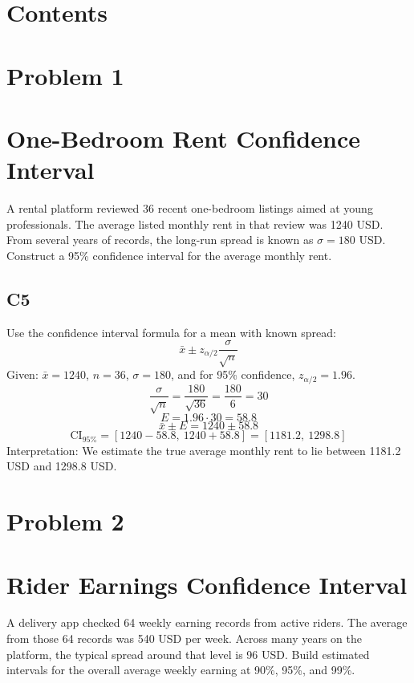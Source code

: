 


\section*{Contents}
\setcounter{tocdepth}{2}
\setcounter{secnumdepth}{1}
\tableofcontents


	\begin{ExamProblems}
		\item
		\section{Problem 1}
		\section{One-Bedroom Rent Confidence Interval}
		A rental platform reviewed 36 recent one-bedroom listings aimed at young professionals.
		The average listed monthly rent in that review was 1240 USD.
		From several years of records, the long-run spread is known as $\sigma=180$ USD.
		Construct a 95\% confidence interval for the average monthly rent.

		\subsection*{C5}
		Use the confidence interval formula for a mean with known spread:
		\[
		\bar{x} \pm z_{\alpha/2}\frac{\sigma}{\sqrt{n}}
		\]
		Given: $\bar{x}=1240$, $n=36$, $\sigma=180$, and for 95\% confidence, $z_{\alpha/2}=1.96$.
		\[
		\frac{\sigma}{\sqrt{n}}=\frac{180}{\sqrt{36}}=\frac{180}{6}=30
		\]
		\[
		E=1.96\cdot 30=58.8
		\]
		\[
		\bar{x}\pm E=1240\pm 58.8
		\]
		\[
		\text{CI}_{95\%}=[1240-58.8,\ 1240+58.8]=[1181.2,\ 1298.8]
		\]
		Interpretation: We estimate the true average monthly rent to lie between 1181.2 USD and 1298.8 USD.

		\newpage
		\item
		\section{Problem 2}
		\section{Rider Earnings Confidence Interval}
		A delivery app checked 64 weekly earning records from active riders.
		The average from those 64 records was 540 USD per week.
		Across many years on the platform, the typical spread around that level is 96 USD.
		Build estimated intervals for the overall average weekly earning at 90\%, 95\%, and 99\%.


\end{ExamProblems}
